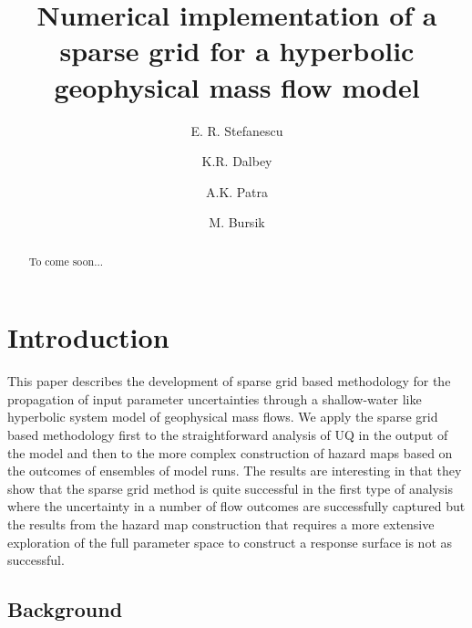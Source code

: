 \documentclass{article}
\begin{document}
\title{Numerical implementation of a sparse grid for a hyperbolic geophysical mass flow model}
\author[1]{ E. R. Stefanescu }
\author[2]{K.R. Dalbey}
\author[1]{A.K. Patra}
\author[3]{M. Bursik}




\maketitle

\begin{abstract}
To come soon...
\end{abstract}



\section{Introduction}
This paper describes the development of sparse grid based methodology for the propagation of input 
parameter uncertainties through a shallow-water like hyperbolic system model of 
geophysical mass flows. We apply the sparse grid based 
methodology first to the straightforward analysis of  UQ in the output of 
the model and then to the more complex construction of hazard maps based on the 
outcomes of ensembles of model runs. The results are interesting in that they show that the sparse grid 
method is quite successful in the first type of analysis where the uncertainty in a number of flow outcomes are successfully 
captured but the results from the hazard map construction that requires a more extensive exploration of the 
full parameter space to construct a response surface is not as successful.

\subsection{Background} 
\end{document}
